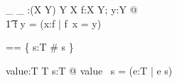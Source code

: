 \begin{gendef}[X, Y]
\_  \entryFor \_ :(X \inj Y) \cross Y \pfun X
\where
\forall f:X \inj Y; y:Y @  \\
\t1	f \entryFor y = (\mu x:\dom f | f~x = y)
\end{gendef}
		

\begin{zed} 
  \optional[T] == \{ s:\power T \mid \# s  \} \\
\end{zed}
		

\begin{gendef}[T]
   value:\power T \pfun T
\where
   \forall s:\power T @ value~ s = (\mu e:T | e \in s) 
\end{gendef}
		